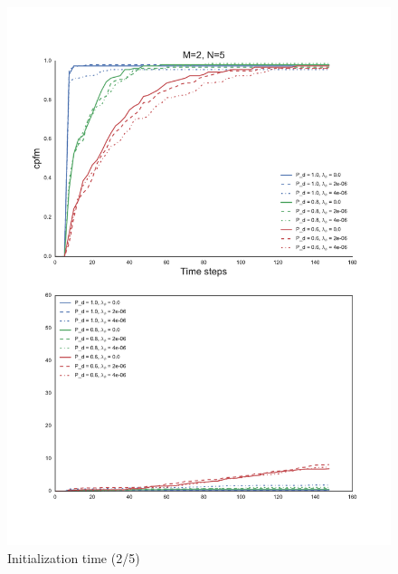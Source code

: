 {\begin{figure}
\centering
\includegraphics[height = .9\textheight]{Figures/plots/Scenario1_Init-Time(2-5).pdf}
\caption{Initialization time (2/5)}\label{fig:init_time_2-5}
\end{figure}

}

